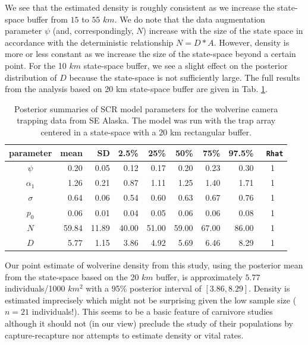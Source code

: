 {We see that the estimated density is roughly consistent as we increase
the state-space buffer from $15$ to $55$ $km$. We do note that the data
augmentation parameter $\psi$ (and, correspondingly, $N$) increase with
the size of the state space in accordance with the deterministic
relationship $N= D*A$. However, density is more or less constant as we
increase the size of the state-space beyond a certain point.  For the
10 $km$ state-space buffer, we see a slight effect on the posterior
distribution of $D$ because the state-space is not sufficiently large.
The full results from the analysis based on 20 km state-space buffer
are given in Tab. \ref{scr0.tab.wolverine-results2}.

\begin{table}
\centering
\caption{
Posterior summaries of SCR model parameters for the wolverine camera
trapping data from SE Alaska. The model was run with the trap array
centered in a state-space with a $20$ km
rectangular buffer.
}
\begin{tabular}{crrrrrrrc}
\hline \hline
parameter & mean & SD & 2.5\% & 25\% & 50\% & 75\% & 97.5\% &\mbox{\tt
  Rhat}  \\
\hline
$\psi$  &      0.20&  0.05&   0.12&   0.17&   0.20&   0.23&   0.30 &   1 \\
$\alpha_1$ &     1.26&  0.21&   0.87&   1.11&   1.25&   1.40&   1.71 &   1 \\
$\sigma$&      0.64&  0.06&   0.54&   0.60&   0.63&   0.67&   0.76 &   1 \\
$p_0$   &      0.06&  0.01&   0.04&   0.05&   0.06&   0.06&   0.08 &   1 \\
$N$    &     59.84& 11.89&  40.00&  51.00&  59.00&  67.00&  86.00 &   1 \\
$D$    &      5.77&  1.15&   3.86&   4.92&   5.69&   6.46&   8.29 &   1 \\
\end{tabular}
\label{scr0.tab.wolverine-results2}
\end{table}

Our point estimate of wolverine density from this study, using the
posterior mean from the state-space based on the 20 $km$ buffer, is
approximately $5.77$ individuals/1000 $km^2$ with a 95\% posterior
interval of $[3.86, 8.29]$. Density is estimated imprecisely which
might not be surprising given the low sample size ($n=21$
individuals!). This seems to be a basic feature of carnivore studies
although it should not (in our view) preclude the study of their
populations by capture-recapture nor attempts to estimate density or vital rates.


}
